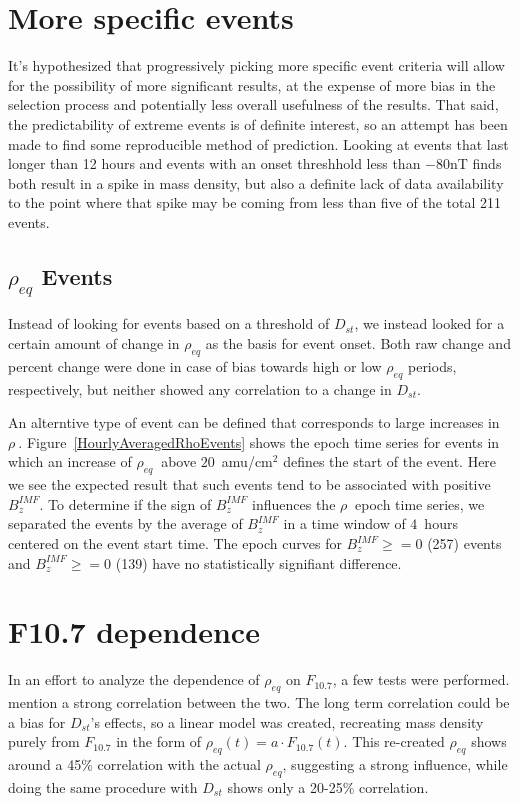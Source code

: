 \documentclass[10pt,twocolumn]{article}
\newcommand{\req}{\ensuremath{\rho_{eq}}}
\begin{document}
\section{More specific events}
It's hypothesized that progressively picking more specific event criteria will allow for the possibility of more significant results, at the expense of more bias in the selection process and potentially less overall usefulness of the results. That said, the predictability of extreme events is of definite interest, so an attempt has been made to find some reproducible method of prediction. Looking at events that last longer than 12 hours and events with an onset threshhold less than $-80$nT finds both result in a spike in mass density, but also a definite lack of data availability to the point where that spike may be coming from less than five of the total 211 events. 

\subsection{$\rho_{eq}$ Events}

Instead of looking for events based on a threshold of $D_{st}$, we instead looked for a certain amount of change in $\rho_{eq}$ as the basis for event onset. Both raw change and percent change were done in case of bias towards high or low $\rho_{eq}$ periods, respectively, but neither showed any correlation to a change in $D_{st}$. 

An alterntive type of event can be defined that corresponds to large increases in $\rho\ $.  Figure~\ref{HourlyAveragedRhoEvents} shows the epoch time series for events in which an increase of $\req\ $ above $20$~amu/cm$^2$ defines the start of the event.  Here we see the expected result that such events tend to be associated with positive $B_z^{IMF}$.  To determine if the sign of $B_z^{IMF}$ influences the $\rho\ $ epoch time series, we separated the events by the average of $B_z^{IMF}$ in a time window of $4$~hours centered on the event start time.  The epoch curves for $B_z^{IMF}\geq=0$ (257) events and $B_z^{IMF}\ge=0$ (139) have no statistically signifiant difference.

\section{F10.7 dependence}
In an effort to analyze the dependence of $\rho_{eq}$ on $F_{10.7}$, a few tests were performed. \cite{Takahashi2010} mention a strong correlation between the two. The long term correlation could be a bias for $D_{st}$'s effects, so a linear model was created, recreating mass density purely from $F_{10.7}$ in the form of $\rho_{eq}(t)=a\cdot F_{10.7}(t)$. This re-created $\rho_{eq}$ shows around a 45\% correlation with the actual $\rho_{eq}$, suggesting a strong influence, while doing the same procedure with $D_{st}$ shows only a 20-25\% correlation. 
\end{document}
